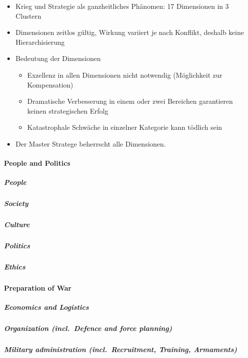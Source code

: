 {}\documentclass[a4paper]{article}
\providecommand{\tightlist}{\setlength{\itemsep}{1mm}\setlength{\parskip}{1mm}}
\begin{document}
\begin{itemize}
	\tightlist
	\item
	      Krieg und Strategie als ganzheitliches Phänomen: 17 Dimensionen in 3
	      Clustern
	\item
	      Dimensionen zeitlos gültig, Wirkung variiert je nach Konflikt, deshalb
	      keine Hierarchisierung
	\item
	      Bedeutung der Dimensionen

	      \begin{itemize}
		      \tightlist
		      \item
		            Exzellenz in allen Dimensionen nicht notwendig (Möglichkeit zur
		            Kompensation)
		      \item
		            Dramatische Verbesserung in einem oder zwei Bereichen garantieren
		            keinen strategischen Erfolg
		      \item
		            Katastrophale Schwäche in einzelner Kategorie kann tödlich sein
	      \end{itemize}
	\item
	      Der Master Stratege beherrscht alle Dimensionen.
\end{itemize}

\paragraph{People and Politics}\label{people-and-politics}

\subparagraph{People}\label{people}

\subparagraph{Society}\label{society}

\subparagraph{Culture}\label{culture}

\subparagraph{Politics}\label{politics}

\subparagraph{Ethics}\label{ethics}

\paragraph{Preparation of War}\label{preparation-of-war}

\subparagraph{Economics and Logistics}\label{economics-and-logistics}

\subparagraph{Organization (incl.~Defence and force
	planning)}\label{organization-incl.-defence-and-force-planning}

\subparagraph{Military administration (incl.~Recruitment, Training,
	Armaments)}\label{military-administration-incl.-recruitment-training-armaments}
\end{document}
